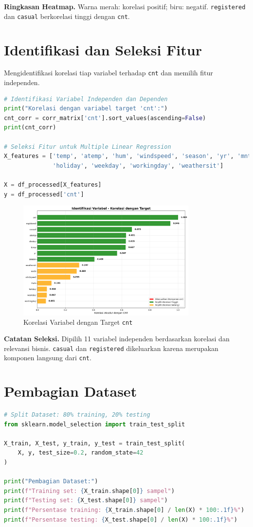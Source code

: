 \documentclass[11pt,a4paper]{article}
\begin{document}
\noindent\textbf{Ringkasan Heatmap.}
Warna merah: korelasi positif; biru: negatif. \texttt{registered} dan \texttt{casual} berkorelasi tinggi dengan \texttt{cnt}.

\section{Identifikasi dan Seleksi Fitur}
Mengidentifikasi korelasi tiap variabel terhadap \texttt{cnt} dan memilih fitur independen.
\begin{lstlisting}[language=Python]
# Identifikasi Variabel Independen dan Dependen
print("Korelasi dengan variabel target 'cnt':")
cnt_corr = corr_matrix['cnt'].sort_values(ascending=False)
print(cnt_corr)

# Seleksi Fitur untuk Multiple Linear Regression
X_features = ['temp', 'atemp', 'hum', 'windspeed', 'season', 'yr', 'mnth',
              'holiday', 'weekday', 'workingday', 'weathersit']

X = df_processed[X_features]
y = df_processed['cnt']
\end{lstlisting}

\begin{figure}[h]
    \centering
    \includegraphics[width=0.8\textwidth]{./OUTPUT/step5_feature_selection.png}
    \caption{Korelasi Variabel dengan Target \texttt{cnt}}
    \label{fig:feature_selection}
\end{figure}

\noindent\textbf{Catatan Seleksi.}
Dipilih 11 variabel independen berdasarkan korelasi dan relevansi bisnis. \texttt{casual} dan \texttt{registered} dikeluarkan karena merupakan komponen langsung dari \texttt{cnt}.

\section{Pembagian Dataset}
\begin{lstlisting}[language=Python]
# Split Dataset: 80% training, 20% testing
from sklearn.model_selection import train_test_split

X_train, X_test, y_train, y_test = train_test_split(
    X, y, test_size=0.2, random_state=42
)

print("Pembagian Dataset:")
print(f"Training set: {X_train.shape[0]} sampel")
print(f"Testing set: {X_test.shape[0]} sampel")
print(f"Persentase training: {X_train.shape[0] / len(X) * 100:.1f}%")
print(f"Persentase testing: {X_test.shape[0] / len(X) * 100:.1f}%")
\end{lstlisting}
\end{document}
